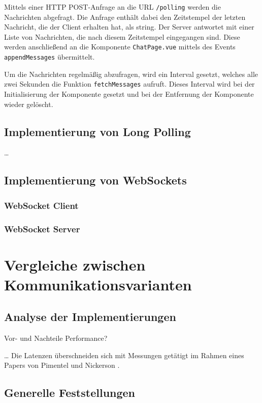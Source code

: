 \documentclass[sigplan, screen]{acmart}
\begin{document}
Mittels einer HTTP POST-Anfrage an die URL \texttt{/polling} werden die Nachrichten abgefragt.
Die Anfrage enthält dabei den Zeitstempel der letzten Nachricht, die der Client erhalten hat, als string.
Der Server antwortet mit einer Liste von Nachrichten, die nach diesem Zeitstempel eingegangen sind.
Diese werden anschließend an die Komponente \texttt{ChatPage.vue} mittels des Events \texttt{appendMessages} übermittelt.

Um die Nachrichten regelmäßig abzufragen, wird ein Interval gesetzt, welches alle zwei Sekunden die Funktion \texttt{fetchMessages} aufruft.
Dieses Interval wird bei der Initialisierung der Komponente gesetzt und bei der Entfernung der Komponente wieder gelöscht.



\subsection{Implementierung von Long Polling}

\dots

\subsection{Implementierung von WebSockets}

\subsubsection{WebSocket Client}

\subsubsection{WebSocket Server}

\section{Vergleiche zwischen Kommunikationsvarianten}


\subsection{Analyse der Implementierungen}

Vor- und Nachteile
Performance?

… Die Latenzen überschneiden sich mit Messungen getätigt im Rahmen eines Papers von Pimentel und Nickerson \cite{pimentel_communicating_2012}.

\subsection{Generelle Feststellungen}
\end{document}
